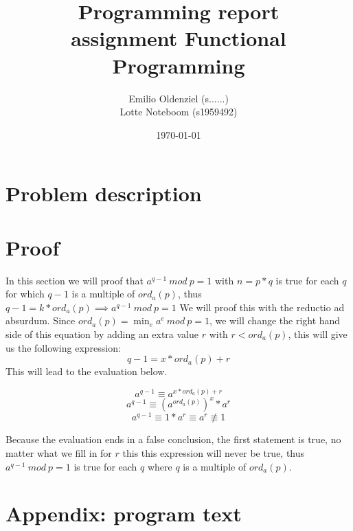 \documentclass[a4paper]{article}
\begin{document}
\title{Programming report\\
       assignment Functional Programming
}
\date{\today}
\author{Emilio Oldenziel (s......)\\  Lotte Noteboom (s1959492)}

\maketitle

\section{Problem description}

\section{Proof}
In this section we will proof that $a^{q-1} \: mod \: p = 1 $ with $n=p*q$ is true for each $q$ for which
$q-1$ is a multiple of $ord_{a}(p)$, thus 
$q-1 = k * ord_{a}(p) \implies a^{q-1} \: mod \: p = 1$
We will proof this with the reductio ad absurdum. Since $ord_{a}(p) = \operatorname*{min}_e a^{e} \: mod \: p =1$, we will change the right
hand side of this equation by adding an extra value $r$ with $r < ord_{a}(p)$, this will give us the following expression:
\[q-1 = x * ord_{a}(p) + r\]
This will lead to the evaluation below.

\[a^{q - 1} \equiv a^{x*ord_{a}(p) + r}\]
\[a^{q - 1} \equiv (a^{ord_{a}(p)})^{x} * a^{r}\]
\[a^{q - 1} \equiv 1 * a^{r} \equiv a^{r} \not\equiv 1\]

Because the evaluation ends in a false conclusion, the first statement is true, no matter what we fill in for $r$ this
this expression will never be true, thus $a^{q-1} \: mod \: p = 1 $ is true for each $q$ where $q$ is a multiple of
$ord_{a}(p)$.
\newpage
\section{Appendix: program text}
%
\end{document}
